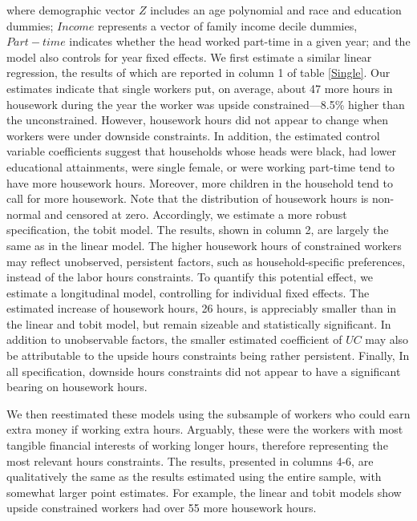 where demographic vector $Z$ includes an age polynomial and race and education dummies; $Income$ represents a vector of family income decile dummies, $Part-time$ indicates whether the head worked part-time in a given year; and the model also controls for year fixed effects.  We first estimate a similar linear regression, the results of which are reported in column 1 of table \ref{Single}. Our estimates indicate that single workers put, on average, about 47 more hours in housework during the year the worker was upside constrained---8.5\% higher than the unconstrained. However, housework hours did not appear to change when workers were under downside constraints. In addition, the estimated control variable coefficients suggest that households whose heads were black, had lower educational attainments, were single female, or were working part-time tend to have more housework hours.  Moreover, more children in the household tend to call for more housework. Note that the distribution of housework hours is non-normal and censored at zero.  Accordingly, we estimate a more robust specification, the tobit model.  The results, shown in column 2, are largely the same as in the linear model. The higher housework hours of constrained workers may reflect unobserved, persistent factors, such as household-specific preferences, instead of the labor hours constraints.  To quantify this potential effect, we estimate a longitudinal model, controlling for individual fixed effects.  The estimated increase of housework hours, 26 hours, is appreciably smaller than in the linear and tobit model, but remain sizeable and statistically significant. In addition to unobservable factors, the smaller estimated coefficient of $UC$ may also be attributable to the upside hours constraints being rather persistent. Finally, In all specification, downside hours constraints did not appear to have a significant bearing on housework hours.

We then reestimated these models using the subsample of workers who could earn extra money if working extra hours. Arguably, these were the workers with most tangible financial interests of working longer hours, therefore representing the most relevant hours constraints. The results, presented in columns 4-6, are qualitatively the same as the results estimated using the entire sample, with somewhat larger point estimates.  For example, the linear and tobit models show upside constrained workers had over 55 more housework hours.

